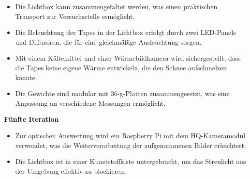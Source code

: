 \begin{itemize}
    \item Die Lichtbox kann zusammengefaltet werden, was einen praktischen Transport zur Versuchsstelle ermöglicht.
    \item Die Beleuchtung der Tapes in der Lichtbox erfolgt durch zwei LED-Panels und Diffusoren, die für eine gleichmäßige Ausleuchtung sorgen.
    \item Mit einem Kältemittel und einer Wärmebildkamera wird sichergestellt, dass die Tapes keine eigene Wärme entwickeln, die den Schnee aufschmelzen könnte.
    \item Die Gewichte sind modular mit 36-g-Platten zusammengesetzt, was eine Anpassung an verschiedene Messungen ermöglicht.
\end{itemize}

\textbf{Fünfte Iteration}

\begin{itemize}
    \item Zur optischen Auswertung wird ein Raspberry Pi mit dem HQ-Kameramodul verwendet, was die Weiterverarbeitung der aufgenommenen Bilder erleichtert.
    \item Die Lichtbox ist in einer Kunststoffkiste untergebracht, um das Streulicht aus der Umgebung effektiv zu blockieren.
\end{itemize}
